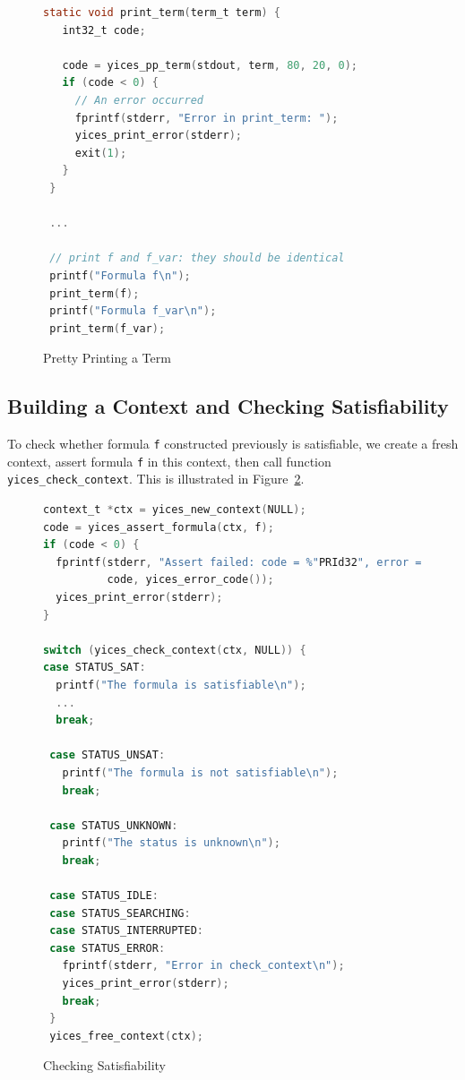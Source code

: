 \documentclass[11pt,twoside,fleqn,openright,titlepage]{cslreport}
\begin{document}
\begin{figure}
\begin{footnotesize}
\begin{lstlisting}[language=C,morekeywords={int32_t},stringstyle=\color{red},commentstyle=\color{olive}]
 static void print_term(term_t term) {
   int32_t code;

   code = yices_pp_term(stdout, term, 80, 20, 0);
   if (code < 0) {
     // An error occurred
     fprintf(stderr, "Error in print_term: ");
     yices_print_error(stderr);
     exit(1);
   }
 }

 ...

 // print f and f_var: they should be identical
 printf("Formula f\n");
 print_term(f);
 printf("Formula f_var\n");
 print_term(f_var);
\end{lstlisting}
\end{footnotesize}
\caption{Pretty Printing a Term}
\label{pretty-printing}
\end{figure}

\subsection*{Building a Context and Checking Satisfiability}

To check whether formula \texttt{f} constructed previously is
satisfiable, we create a fresh context, assert formula \texttt{f}
in this context, then call function
\texttt{yices\_check\_context}. This is illustrated in
Figure~\ref{context-check}.

\begin{figure}
\begin{footnotesize}
\begin{lstlisting}[language=C,morekeywords={context_t},stringstyle=\color{red},commentstyle=\color{olive}]
context_t *ctx = yices_new_context(NULL);
code = yices_assert_formula(ctx, f);
if (code < 0) {
  fprintf(stderr, "Assert failed: code = %"PRId32", error = %"PRId32"\n",
          code, yices_error_code());
  yices_print_error(stderr);
}

switch (yices_check_context(ctx, NULL)) {
case STATUS_SAT:
  printf("The formula is satisfiable\n");
  ...
  break;

 case STATUS_UNSAT:
   printf("The formula is not satisfiable\n");
   break;

 case STATUS_UNKNOWN:
   printf("The status is unknown\n");
   break;

 case STATUS_IDLE:
 case STATUS_SEARCHING:
 case STATUS_INTERRUPTED:
 case STATUS_ERROR:
   fprintf(stderr, "Error in check_context\n");
   yices_print_error(stderr);
   break;
 }
 yices_free_context(ctx);
\end{lstlisting}
\end{footnotesize}
\caption{Checking Satisfiability}
\label{context-check}
\end{figure}
\end{document}
